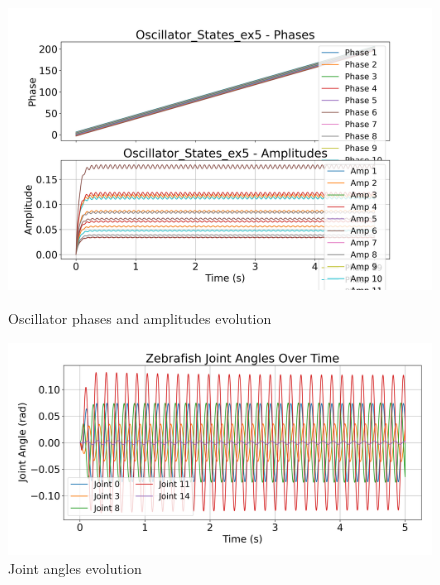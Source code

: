 \documentclass{cmc}
\begin{document}
\begin{figure}[H]
    \centering
    \begin{minipage}{0.48\textwidth}
        \centering
        \includegraphics[width=\linewidth]{our_figures/Oscillator_States_ex5.png}
        \caption{Oscillator phases and amplitudes evolution}
        \label{fig:Oscillator_States_ex5}
    \end{minipage}\hfill
    \begin{minipage}{0.48\textwidth}
        \centering
        \includegraphics[width=\linewidth]{our_figures/Joint_Angles_ex5.png}
        \caption{Joint angles evolution}
        \label{fig:Joint_Angles_ex5}
    \end{minipage}
\end{figure}
\end{document}

